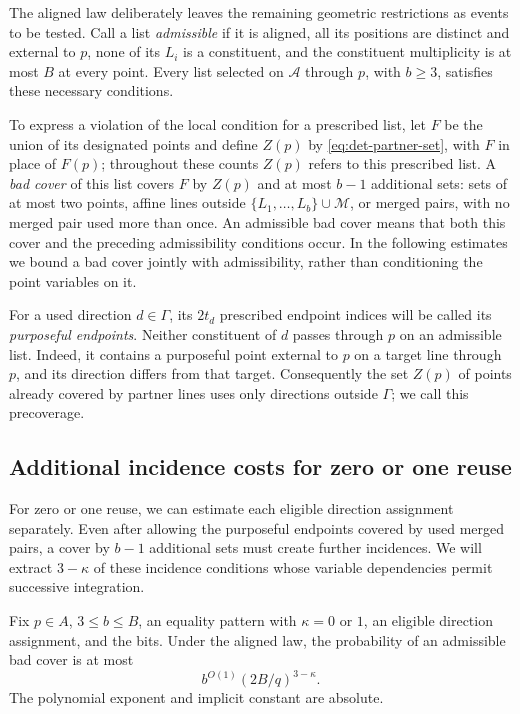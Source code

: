 The aligned law deliberately leaves the remaining geometric restrictions
as events to be tested.  Call a list \emph{admissible} if it is aligned,
all its positions are distinct and external to $p$, none of its $L_i$ is
a constituent, and the constituent multiplicity is at most $B$ at every
point.  Every list selected on $\mathcal A$ through $p$, with $b\ge3$,
satisfies these necessary conditions.

To express a violation of the local condition for a prescribed list,
let $F$ be the union of its designated points and define $Z(p)$ by
\eqref{eq:det-partner-set}, with $F$ in place of $F(p)$; throughout
these counts $Z(p)$ refers to this prescribed list.
A \emph{bad cover} of this list covers $F$ by $Z(p)$ and at most $b-1$
additional sets: sets of at most two points, affine lines outside
$\{L_1,\ldots,L_b\}\cup\mathcal M$, or merged pairs, with no merged
pair used more than once. An admissible bad cover means that both
this cover and the preceding admissibility conditions occur.
In the following estimates we bound a bad cover jointly with
admissibility, rather than conditioning the point variables on it.

For a used direction $d\in\Gamma$, its $2t_d$ prescribed endpoint
indices will be called its \emph{purposeful endpoints}.  Neither
constituent of $d$ passes through $p$ on an admissible list.  Indeed, it
contains a purposeful point external to $p$ on a target line through $p$,
and its direction differs from that target. Consequently the set $Z(p)$
of points already covered by partner lines uses only directions outside
$\Gamma$; we call this precoverage.

\subsection{Additional incidence costs for zero or one reuse}

For zero or one reuse, we can estimate each eligible direction assignment
separately.  Even after allowing the purposeful endpoints covered by used
merged pairs, a cover by $b-1$ additional sets must create further
incidences.  We will extract $3-\kappa$ of these incidence conditions
whose variable dependencies permit successive integration.

\begin{lemma}\label{lem:pencil-small-reuse}
Fix $p\in A$, $3\le b\le B$, an equality pattern with $\kappa=0$ or $1$,
an eligible direction assignment, and the bits.  Under the aligned law,
the probability of an admissible bad cover is at most
\[
 b^{O(1)}(2B/q)^{3-\kappa}.
\]
The polynomial exponent and implicit constant are absolute.
\end{lemma}

